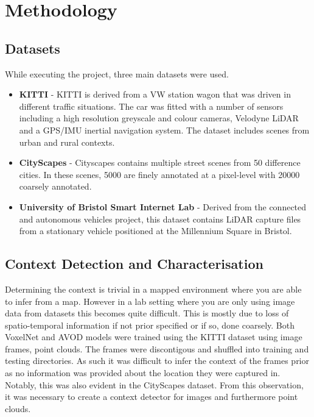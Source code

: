 \let\textcircled=\pgftextcircled


\chapter{Methodology}
\label{chap:methodology}


\section{Datasets}
	
While executing the project, three main datasets were used. 
	\begin{itemize}
		\item \textbf{KITTI }- KITTI is derived from a  VW station wagon that was driven in different traffic situations. The car was fitted with a number of sensors including a high resolution greyscale and colour cameras, Velodyne LiDAR and a GPS/IMU inertial navigation system. The dataset includes scenes from urban and rural contexts. 
		\item \textbf{CityScapes} -  Cityscapes contains multiple street scenes from 50 difference cities. In these scenes, 5000 are finely annotated at a pixel-level with 20000 coarsely annotated. 
	
		\item \textbf{University of Bristol Smart Internet Lab} - Derived from the connected and autonomous vehicles project, this dataset contains LiDAR capture files from a stationary vehicle positioned at the Millennium Square in Bristol. 
	\end{itemize}


\section{ Context Detection and Characterisation}

Determining the context is trivial in a mapped environment where you are able to infer from a map. However in a lab setting where you are only using image data from datasets this becomes quite difficult. This is mostly due to loss of spatio-temporal information if not prior specified or if so, done coarsely. Both VoxelNet and AVOD models were trained using the KITTI dataset using image frames, point clouds. The frames were discontigous and shuffled into training and testing directories. As such it was difficult to infer the context of the frames prior as no information was provided about the location they were captured in. Notably, this was also evident in the CityScapes dataset. From this observation, it was necessary to create a context detector for images and furthermore point clouds. 

